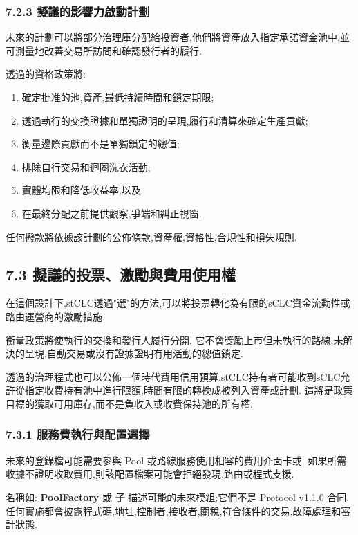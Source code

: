 \documentclass[11pt]{article}
\begin{document}
\subsubsection*{7.2.3 擬議的影響力啟動計劃}

未來的計劃可以將部分治理庫分配給投資者,他們將資產放入指定承諾資金池中,並可測量地改善交易所訪問和確認發行者的履行.

透過的資格政策將:

\begin{enumerate}[leftmargin=*]
\item 確定批准的池,資產,最低持續時間和鎖定期限;
\item 透過執行的交換證據和單獨證明的呈現,履行和清算來確定生產貢獻;
\item 衡量邊際貢獻而不是單獨鎖定的總值;
\item 排除自行交易和迴圈洗衣活動;
\item 實體均限和降低收益率;以及
\item 在最終分配之前提供觀察,爭端和糾正視窗.
\end{enumerate}
任何撥款將依據該計劃的公佈條款,資產權,資格性,合規性和損失規則.

\subsection*{7.3 擬議的投票、激勵與費用使用權}

在這個設計下,stCLC透過"選"的方法,可以將投票轉化為有限的sCLC資金流動性或路由運營商的激勵措施.

衡量政策將使執行的交換和發行人履行分開. 它不會獎勵上市但未執行的路線,未解決的呈現,自動交易或沒有證據證明有用活動的總值鎖定.

透過的治理程式也可以公佈一個時代費用信用預算.stCLC持有者可能收到sCLC允許從指定收費持有池中進行限額,時間有限的轉換成被列入資產或計劃. 這將是政策目標的獲取可用庫存,而不是負收入或收費保持池的所有權.

\subsubsection*{7.3.1 服務費執行與配置選擇}

未來的登錄檔可能需要參與 Pool 或路線服務使用相容的費用介面卡或. 如果所需收據不證明收取費用,則該配置檔案可能會拒絕發現,路由或程式支援.

名稱如: \textbf{PoolFactory } 或 \textbf{ 子} 描述可能的未來模組;它們不是 Protocol v1.1.0 合同.任何實施都會披露程式碼,地址,控制者,接收者,關稅,符合條件的交易,故障處理和審計狀態.
\end{document}
